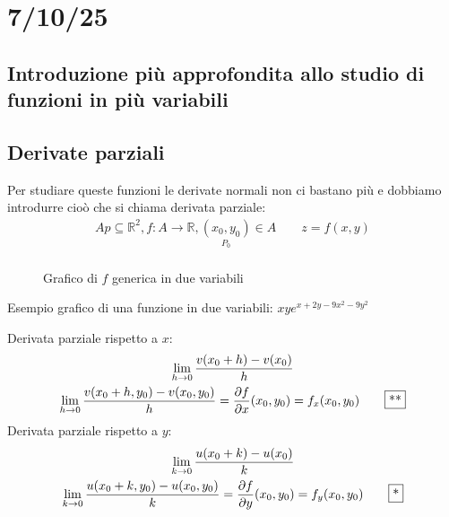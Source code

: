 \documentclass[a4paper, oneside]{article}
\begin{document}
            \newpage
            \section{7/10/25}
            \subsection{Introduzione più approfondita allo studio di funzioni in più variabili}
    \subsection{Derivate parziali}
    Per studiare queste funzioni le derivate normali non ci bastano più e dobbiamo introdurre cioò che si chiama derivata parziale:
        \begin{gather*}
            Ap \subseteq \mathbb{R}^2, f:A \to \mathbb{R}, \underset{P_0}{(x_0,y_0)} \in A\qquad z = f(x,y)\\ 
        \end{gather*}

    \begin{figure}[tbh]
    \centering
    
    \caption{Grafico di $f$ generica in due variabili}\label{fig:testsvg}
    \end{figure}


    Esempio grafico di una funzione in due variabili: $xye^{x+2y-9x^2-9y^2}$\\
    \begin{center}
    \end{center}

    \begin{definition}
        Derivata parziale rispetto a $x$:
        \begin{gather*}
            \lim_{h \to 0}\frac{v(x_0+h)-v(x_0)}{h}\\
            \lim_{h \to 0}\frac{v(x_0+h,y_0)-v(x_0,y_0)}{h} = \frac{\partial f}{\partial x} (x_0,y_0) = f_x(x_0,y_0) \qquad \text{\fbox{**}}\\
        \end{gather*}
        Derivata parziale rispetto a $y$:
        \begin{gather*}
            \lim_{k \to 0}\frac{u(x_0+k)-u(x_0)}{k}\\
            \lim_{k \to 0}\frac{u(x_0+k,y_0)-u(x_0,y_0)}{k} = \frac{\partial f}{\partial y} (x_0,y_0) = f_y(x_0,y_0) \qquad \text{\fbox{*}}\\
        \end{gather*}
    \end{definition}
\end{document}

